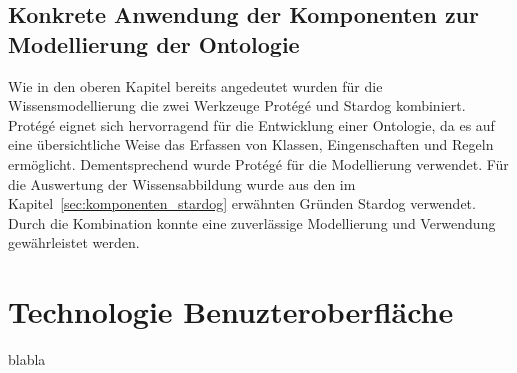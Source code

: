 \subsection{Konkrete Anwendung der Komponenten zur Modellierung der Ontologie}
\label{subsec:komponenten_anwendung}
Wie in den oberen Kapitel bereits angedeutet wurden für die Wissensmodellierung die zwei Werkzeuge Protégé und Stardog kombiniert. Protégé eignet sich hervorragend für die Entwicklung einer Ontologie, da es auf eine übersichtliche Weise das Erfassen von Klassen, Eingenschaften und Regeln ermöglicht. Dementsprechend wurde Protégé für die Modellierung verwendet.
Für die Auswertung der Wissensabbildung wurde aus den im Kapitel~\ref{sec:komponenten_stardog} erwähnten Gründen Stardog verwendet. Durch die Kombination konnte eine zuverlässige Modellierung und Verwendung gewährleistet werden. 


\section{Technologie Benuzteroberfläche}
\label{sec:komponenten_ember}
blabla

